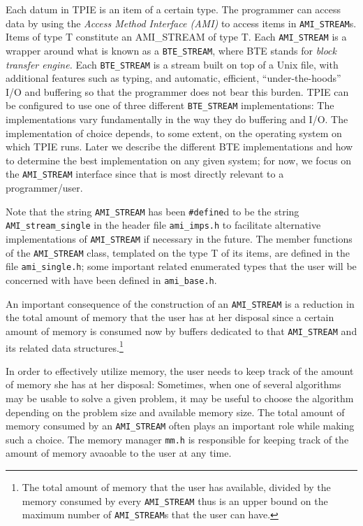 Each datum in TPIE is an item of a certain type.
The programmer can access data by using the
\emph{Access Method Interface (AMI)} to access items in 
\verb|AMI_STREAM|s. Items of type T constitute an AMI\_STREAM of 
type T. Each \verb|AMI_STREAM| is a wrapper around  what is known
as a \verb|BTE_STREAM|, where BTE stands for \emph{block transfer
engine.} Each \verb|BTE_STREAM| is a stream built on top of a Unix file, with 
additional features such as typing,  and automatic, efficient,
``under-the-hoods'' I/O and buffering so that the programmer does
not bear this burden. TPIE can be configured to use one of three
different \verb|BTE_STREAM| implementations: The implementations vary
fundamentally in the way they do buffering and I/O. The implementation
of choice depends, to some extent, on the operating system on which 
TPIE runs. Later we describe the different BTE implementations and
how to determine the best implementation on any given system; for now,
we focus on the \verb|AMI_STREAM| interface since that is most directly
relevant to a programmer/user.


Note that the string \verb|AMI_STREAM| has
 been \verb|#define|d to be the string \verb|AMI_stream_single| in the
 header file \verb|ami_imps.h| to facilitate alternative implementations
of \verb|AMI_STREAM| if necessary in the future.
The member functions of the \verb|AMI_STREAM| class,
templated on the type T of its items,  are defined in the file \verb|ami_single.h|;
some important related enumerated types that the user will be
 concerned with have been defined in \verb|ami_base.h|.


An important consequence of the construction of an \verb|AMI_STREAM| is a
reduction in the total amount of memory that the user has at her
disposal since a certain amount of memory is consumed now by buffers
dedicated to that \verb|AMI_STREAM| and its related data
structures.\footnote{The total amount of memory that the user has
available, divided by the memory consumed by every \verb|AMI_STREAM| thus
is an upper bound on the maximum number of \verb|AMI_STREAM|s that the user
can have.}
 
In order to effectively utilize memory, the user needs to keep track
of the amount of memory she has at her disposal: Sometimes, 
when one of several algorithms may be usable to solve a given problem,
it may be useful to choose the algorithm depending on the problem
size and available memory size. The total amount of memory consumed
by an \verb|AMI_STREAM| often plays an important role while making such 
a choice. The memory manager \verb|mm.h| is responsible for keeping
track of the amount of memory avaoable to the user at any time.

